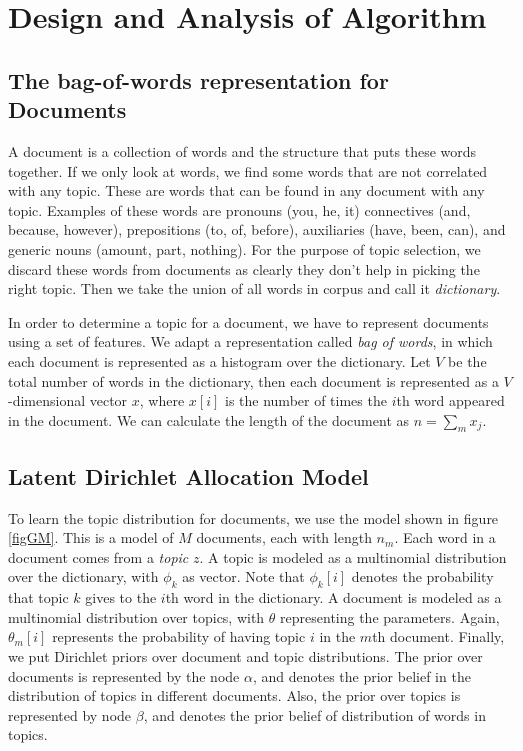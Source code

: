 \documentclass[twoside,12pt]{article}
\begin{document}
\section{Design and Analysis of Algorithm}

\subsection{The bag-of-words representation for Documents}
A document is a collection of words and the structure that puts these words together. If we only look at words, we find some words that are not correlated with any topic. These are words that can be found in any document with any topic. Examples of these words are pronouns (you, he, it) connectives (and, because, however), prepositions (to, of, before), auxiliaries (have, been, can), and generic nouns (amount, part, nothing). For the purpose of topic selection, we discard these words from documents as clearly they don't help in picking the right topic. Then we take the union of all words in corpus and call it \emph{dictionary}.

In order to determine a topic for a document, we have to represent  documents using a set of features. We adapt a representation called \emph{bag of words}, in which each document is represented as a histogram over the dictionary. Let $V$ be the total number of words in the dictionary, then each document is represented as a $V$-dimensional vector $x$, where $x[i]$ is the number of times the $i$th word appeared in the document. We can calculate the length of the document as $n=\sum_{m}x_j.$

\subsection{Latent Dirichlet Allocation Model}
To learn the topic distribution for documents, we use the model shown in figure \ref{figGM}. This is a model of $M$ documents, each with length $n_m$. Each word in a document comes from a \emph{topic} $z$. A topic is modeled as a multinomial distribution over the dictionary, with $\phi_k$ as vector. Note that $\phi_k[i]$ denotes the probability that topic $k$ gives to the $i$th word in the dictionary. A document is modeled as a multinomial distribution over topics, with $\theta$ representing the parameters. Again, $\theta_m[i]$ represents the probability of having topic $i$ in the $m$th document. Finally, we put Dirichlet priors over document and topic distributions. The prior over documents is represented by the node $\alpha$, and denotes the prior belief in the distribution of topics in different documents. Also, the prior over topics is represented by node $\beta$, and denotes the prior belief of distribution of words in topics.
\end{document}
